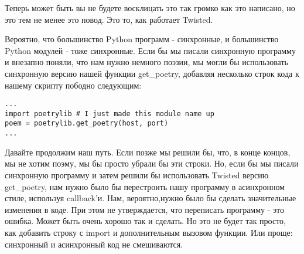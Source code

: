 Теперь может быть вы не будете восклицать это так громко как это написано, 
но это тем не менее это повод. Это то, как работает Twisted.



Вероятно, что большинство Python программ - синхронные, и 
большинство Python модулей - тоже синхронные. Если бы мы 
писали синхронную программу и внезапно поняли, что нам 
нужно немного поэзии, мы могли бы использовать 
синхронную версию нашей функции get\_poetry, добавляя 
несколько строк кода к нашему скрипту пободно следующим:


 \begin{verbatim}
...
import poetrylib # I just made this module name up
poem = poetrylib.get_poetry(host, port)
...
\end{verbatim} 


Давайте продолжим наш путь. Если позже мы решили бы, 
что, в конце концов, мы не хотим поэму, мы бы просто убрали бы 
эти строки. Но, если бы мы 
писали синхронную программу и затем решили бы использовать 
Twisted версию get\_poetry, нам нужно было бы перестроить 
нашу программу в асинхронном стиле, используя callback'и. 
Нам, вероятно,нужно было бы сделать значительные изменения в коде. 
При этом не утверждается, что переписать программу - это ошибка. 
Может быть очень хорошо так и сделать. Но это не будет так просто, как 
добавить строку с import и дополнительным вызовом функции. 
Или проще: синхронный и асинхронный код не смешиваются.  


